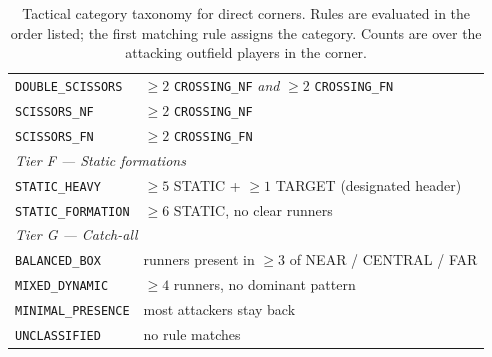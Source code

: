 \begin{table}[h!]
\begin{tabular}{p{5cm} p{8.6cm}}
    \texttt{DOUBLE\_SCISSORS} & $\geq 2$ \texttt{CROSSING\_NF} \emph{and}
                                $\geq 2$ \texttt{CROSSING\_FN} \\
    \texttt{SCISSORS\_NF}      & $\geq 2$ \texttt{CROSSING\_NF} \\
    \texttt{SCISSORS\_FN}      & $\geq 2$ \texttt{CROSSING\_FN} \\
    \midrule
    \multicolumn{2}{l}{\emph{Tier F — Static formations}} \\
    \texttt{STATIC\_HEAVY}     & $\geq 5$ STATIC + $\geq 1$ TARGET (designated
                                header) \\
    \texttt{STATIC\_FORMATION} & $\geq 6$ STATIC, no clear runners \\
    \midrule
    \multicolumn{2}{l}{\emph{Tier G — Catch-all}} \\
    \texttt{BALANCED\_BOX}      & runners present in $\geq 3$ of NEAR / CENTRAL
                                / FAR \\
    \texttt{MIXED\_DYNAMIC}     & $\geq 4$ runners, no dominant pattern \\
    \texttt{MINIMAL\_PRESENCE}  & most attackers stay back \\
    \texttt{UNCLASSIFIED}        & no rule matches \\
    

    \end{tabular}
    \caption{Tactical category taxonomy for direct corners. Rules are evaluated
    in the order listed; the first matching rule assigns the category.
               Counts are over the attacking outfield players in the corner.} 
    \end{table}